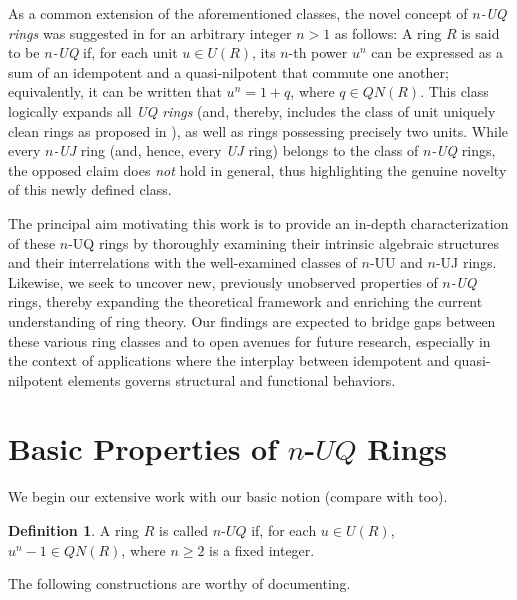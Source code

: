 \documentclass[12pt]{amsart}
\theoremstyle{definition}
\newtheorem{definition}[theorem]{Definition}
\begin{document}
As a common extension of the aforementioned classes, the novel concept of {\it $n$-UQ rings} was suggested in \cite{Tien} for an arbitrary integer $n>1$ as follows: A ring $R$ is said to be {\it $n$-UQ} if, for each unit $u \in U(R)$, its $n$-th power $u^n$ can be expressed as a sum of an idempotent and a quasi-nilpotent that commute one another; equivalently, it can be written that $u^n = 1 + q$, where $q \in QN(R)$. This class logically expands all {\it UQ rings} (and, thereby, includes the class of unit uniquely clean rings as proposed in \cite{13}), as well as rings possessing precisely two units. While every {\it $n$-UJ} ring (and, hence, every {\it UJ} ring) belongs to the class of {\it $n$-UQ} rings, the opposed claim does {\it not} hold in general, thus highlighting the genuine novelty of this newly defined class.

The principal aim motivating this work is to provide an in-depth characterization of these $n$-UQ rings by thoroughly examining their intrinsic algebraic structures and their interrelations with the well-examined classes of $n$-UU and $n$-UJ rings. Likewise, we seek to uncover new, previously unobserved properties of {\it $n$-UQ} rings, thereby expanding the theoretical framework and enriching the current understanding of ring theory. Our findings are expected to bridge gaps between these various ring classes and to open avenues for future research, especially in the context of applications where the interplay between idempotent and quasi-nilpotent elements governs structural and functional behaviors.

\section{Basic Properties of $n$-$UQ$ Rings}

We begin our extensive work with our basic notion (compare with \cite{Tien} too).

\begin{definition}\label{2.1}
A ring $R$ is called $n$-$UQ$ if, for each $u\in U(R)$, $u^n-1\in QN(R)$, where $n\geq2$ is a fixed integer.	
\end{definition}

The following constructions are worthy of documenting.
\end{document}
